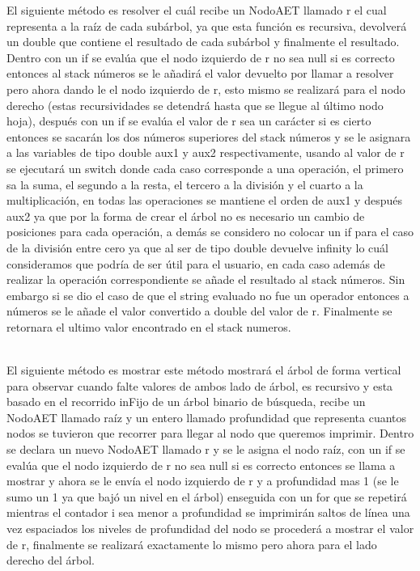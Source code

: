 \documentclass{report}
\begin{document}
El siguiente método es resolver el cuál recibe un NodoAET llamado r el cual representa a la raíz de cada subárbol, ya que esta función es recursiva, devolverá un double que contiene el resultado de cada subárbol y finalmente el resultado. Dentro con un if se evalúa que el nodo izquierdo de r no sea null si es correcto entonces al stack números se le añadirá el valor devuelto por llamar a resolver pero ahora dando le el nodo izquierdo de r, esto mismo se realizará para el nodo derecho (estas recursividades se detendrá hasta que se llegue al último nodo hoja), después con un if se evalúa el valor de r sea un carácter si es cierto entonces se sacarán los dos números superiores del stack números y se le asignara a las variables de tipo double aux1 y aux2 respectivamente, usando al valor de r se ejecutará un switch donde cada caso corresponde a una operación, el primero sa la suma, el segundo a la resta, el tercero a la división y el cuarto a la multiplicación, en todas las operaciones se mantiene el orden de aux1 y después aux2 ya que por la forma de crear el árbol no es necesario un cambio de posiciones para cada operación, a demás se considero no colocar un if para el caso de la división entre cero ya que al ser de tipo double devuelve infinity lo cuál consideramos que podría de ser útil para el usuario, en cada caso además de realizar la operación correspondiente se añade el resultado al stack números. Sin embargo si se dio el caso de que el string evaluado no fue un operador entonces a números se le añade el valor convertido a double del valor de r. Finalmente se retornara el ultimo valor encontrado en el stack numeros.\\\

El siguiente método es mostrar este método mostrará el árbol de forma vertical para observar cuando falte valores de ambos lado de árbol,  es recursivo y esta basado en el recorrido inFijo de un árbol binario de búsqueda, recibe un NodoAET llamado raíz y un entero llamado profundidad que representa cuantos nodos se tuvieron que recorrer para llegar al nodo que queremos imprimir. Dentro se declara un nuevo NodoAET  llamado r y se le asigna el nodo raíz, con un if se evalúa que el nodo izquierdo de r no sea null si es correcto entonces se llama a mostrar y ahora se le envía el nodo izquierdo de r y a profundidad mas 1 (se le sumo un 1 ya que bajó un nivel en el árbol) enseguida con un for que se repetirá mientras el contador i sea menor a profundidad se imprimirán saltos de línea una vez espaciados los niveles de profundidad del nodo se procederá a mostrar el valor de r, finalmente se realizará exactamente lo mismo pero ahora para el lado derecho del árbol.\\\
\end{document}
